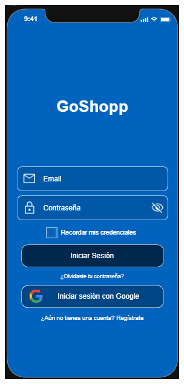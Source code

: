 \documentclass{article}
\begin{document}
\begin{figure}[htbp]
    \centering
    \begin{subfigure}[h]{0.3\textwidth}
        \includegraphics[width=\textwidth]{imagenes/modelos/login.png}

\end{subfigure}
\end{figure}
\end{document}
